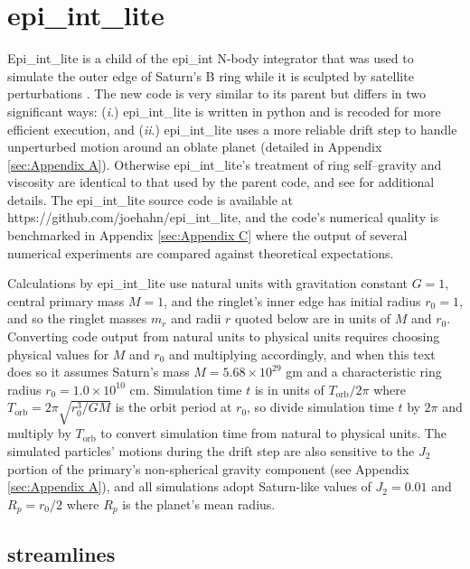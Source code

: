 \documentclass[preprint]{aastex62}
\begin{document}
\section{epi\_int\_lite}
\label{sec:epi_int_lite}

Epi\_int\_lite is a child of the epi\_int N-body integrator that was used to
simulate the outer edge of Saturn's B ring while it is sculpted by satellite perturbations
\citep{HS13}. The new code is very similar to its parent but differs in two significant ways:
({\it i}.) epi\_int\_lite is written in python and is recoded for more efficient execution, and
({\it ii}.) epi\_int\_lite uses a more reliable drift step to handle
unperturbed motion around an oblate planet (detailed in Appendix \ref{sec:Appendix A}).
Otherwise epi\_int\_lite's treatment of ring self--gravity and viscosity are identical
to that used by the parent code, and see \cite{HS13} for additional details. The epi\_int\_lite 
source code is available at https://github.com/joehahn/epi\_int\_lite, and the
code's numerical quality is benchmarked in Appendix \ref{sec:Appendix C}
where the output of several numerical experiments are compared against theoretical expectations.

Calculations by epi\_int\_lite use natural units with gravitation constant $G=1$, 
central primary mass $M=1$, and the ringlet's inner edge has initial radius
$r_0=1$, and so the ringlet masses $m_r$ and radii $r$ quoted below are in units of $M$ and $r_0$.
Converting code output from natural units to physical units requires choosing	
physical values for $M$ and $r_0$ and multiplying accordingly, and when this text does so
it assumes Saturn's mass $M=5.68\times10^{29}$ gm and a characteristic
ring radius $r_0=1.0\times10^{10}$ cm. Simulation time $t$ is in units of $T_{\text{orb}}/2\pi$
where $T_{\text{orb}} = 2\pi\sqrt{r_0^3/GM}$ is the orbit period at $r_0$, 
so divide simulation time $t$ by $2\pi$ and multiply
by $T_{\text{orb}}$ to convert simulation time from natural to physical units.
The simulated particles' motions during the drift step are also
sensitive to the $J_2$ portion of the primary's non-spherical gravity component 
(see Appendix \ref{sec:Appendix A}), and all simulations
adopt Saturn-like values of $J_2=0.01$ and $R_p=r_0/2$ where $R_p$ is the planet's
mean radius.

\subsection{streamlines}
\label{subsec:streamlines}
\end{document}
